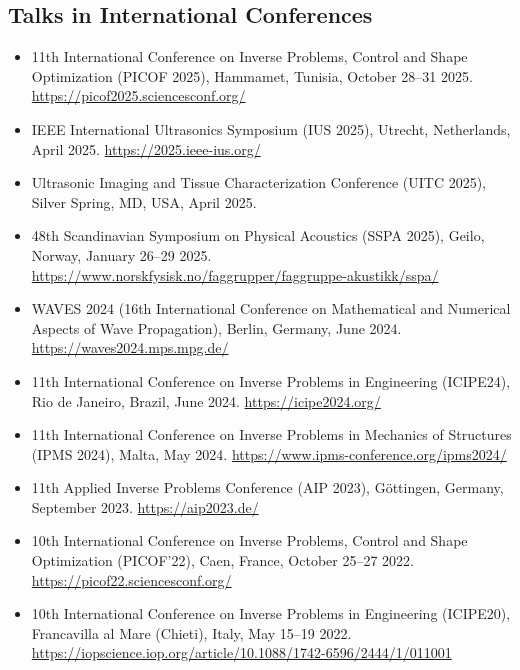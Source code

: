 \documentclass[10pt]{article} %
\begin{document}
\subsection{Talks in International Conferences}
\begin{itemize}
\item 11th International Conference on Inverse Problems, Control and Shape Optimization (PICOF 2025), Hammamet, Tunisia, October 28--31 2025. \url{https://picof2025.sciencesconf.org/}
\item IEEE International Ultrasonics Symposium (IUS 2025), Utrecht, Netherlands, April 2025. \url{https://2025.ieee-ius.org/}
\item Ultrasonic Imaging and Tissue Characterization Conference (UITC 2025), Silver Spring, MD, USA, April 2025.
\item 48th Scandinavian Symposium on Physical Acoustics (SSPA 2025), Geilo, Norway, January 26--29 2025. \url{https://www.norskfysisk.no/faggrupper/faggruppe-akustikk/sspa/}
\item WAVES 2024 (16th International Conference on Mathematical and Numerical Aspects of Wave Propagation), Berlin, Germany, June 2024. \url{https://waves2024.mps.mpg.de/}
\item 11th International Conference on Inverse Problems in Engineering (ICIPE24), Rio de Janeiro, Brazil, June 2024. \url{https://icipe2024.org/}
\item 11th International Conference on Inverse Problems in Mechanics of Structures (IPMS 2024), Malta, May 2024. \url{https://www.ipms-conference.org/ipms2024/}
\item 11th Applied Inverse Problems Conference (AIP 2023), Göttingen, Germany, September 2023. \url{https://aip2023.de/}
\item 10th International Conference on Inverse Problems, Control and Shape Optimization (PICOF'22), Caen, France, October 25--27 2022. \url{https://picof22.sciencesconf.org/}
\item 10th International Conference on Inverse Problems in Engineering (ICIPE20), Francavilla al Mare (Chieti), Italy, May 15--19 2022. \url{https://iopscience.iop.org/article/10.1088/1742-6596/2444/1/011001}
\end{itemize}
\end{document}
